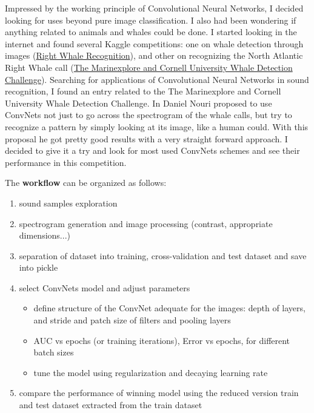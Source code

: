 \documentclass[]{article}
\newcommand{\competition}{The Marinexplore and Cornell University Whale Detection Challenge}
\begin{document}
Impressed by the working principle of Convolutional Neural Networks, I decided looking for uses beyond pure image classification. I also had been wondering if anything related to animals and whales could be done. I started looking in the internet and found several Kaggle competitions: one on whale detection through images (\href{https://www.kaggle.com/c/noaa-right-whale-recognition}{Right Whale Recognition}), and other on recognizing the North Atlantic Right Whale call (\href{https://www.kaggle.com/c/whale-detection-challenge}{\competition}). Searching for applications of Convolutional Neural Networks in sound recognition, I found an entry related to the \competition. In \cite{Nouriblog} Daniel Nouri proposed to use ConvNets not just to go across the spectrogram of the whale calls, but try to recognize a pattern by simply looking at its image, like a human could. With this proposal he got pretty good results with a very straight forward approach. I decided to give it a try and look for most used ConvNets schemes and see their performance in this competition.

The \textbf{workflow} can be organized as follows:
\begin{enumerate}
	\item sound samples exploration
	\item spectrogram generation and image processing (contrast, appropriate dimensions...)
	\item separation of dataset into training, cross-validation and test dataset and save into pickle 
	\item select ConvNets model and adjust parameters
	\begin{itemize}
		\item define structure of the ConvNet adequate for the images: depth of layers, and stride and patch size of filters and pooling layers
		\item AUC vs epochs (or training iterations), Error vs epochs, for different batch sizes
		\item tune the model using regularization and decaying learning rate		
	\end{itemize}
	\item compare the performance of winning model using the reduced version train and test dataset extracted from the train dataset
\end{enumerate}

\pagebreak
\end{document}
